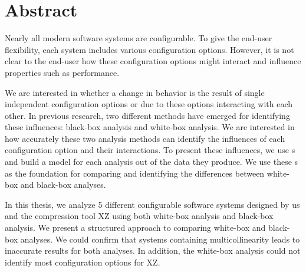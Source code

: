 \begingroup
\let\clearpage\relax
\let\cleardoublepage\relax
\let\cleardoublepage\relax

\chapter*{Abstract}
Nearly all modern software systems are configurable. To give the end-user flexibility, each system includes various configuration options.
However, it is not clear to the end-user how these configuration options might interact and influence properties such as performance. 

We are interested in whether a change in behavior is the result of single independent configuration options or due to these options 
interacting with each other. In previous research, two different methods have emerged for identifying these influences: 
black-box analysis and white-box analysis. 
We are interested in how accurately these two analysis methods can identify the influences of each configuration option and their interactions. 
To present these influences, we use {\perfInfluenceModel}s and build a model for each analysis out of the data 
they produce. 
We use these {\perfInfluenceModel}s as the foundation for comparing and identifying the differences between white-box and black-box analyses.

In this thesis, we analyze 5 different configurable software systems designed by us and the compression tool \textsc{XZ} using both white-box analysis
and black-box analysis. We present a structured approach to comparing white-box and black-box analyses. 
We could confirm that systems containing multicollinearity leads to inaccurate results for both analyses. 
In addition, the white-box analysis could not identify most configuration options for \textsc{XZ}.
\vfill

\endgroup

\vfill
